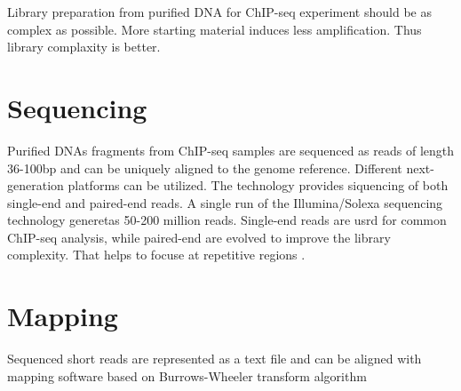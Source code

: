 Library preparation from purified DNA for ChIP-seq experiment should be as complex as possible.
More starting material induces less amplification.
Thus library complaxity is better.


\section{Sequencing}
Purified DNAs fragments from ChIP-seq samples are sequenced as reads of length 36-100bp and can be uniquely aligned to the genome reference.
Different next-generation platforms can be utilized.
The technology provides siquencing of both single-end and paired-end reads.
A single run of the Illumina/Solexa sequencing technology generetas 50-200 million reads\cite{park2009chip}.
Single-end reads are usrd for common ChIP-seq analysis, while paired-end are evolved to improve the library complexity.
That helps to focuse at repetitive regions \cite{chen2012systematic}.

\section{Mapping}
Sequenced short reads are represented as a text file and can be aligned with mapping software based on Burrows-Wheeler transform algorithm \cite{li2009fast} \cite{siren2014indexing}
